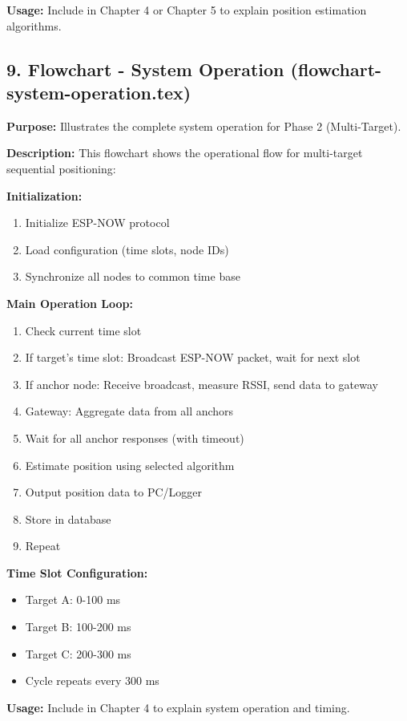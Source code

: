 \textbf{Usage:} Include in Chapter 4 or Chapter 5 to explain position estimation algorithms.

\subsection*{9. Flowchart - System Operation (flowchart-system-operation.tex)}
\textbf{Purpose:} Illustrates the complete system operation for Phase 2 (Multi-Target).

\textbf{Description:}
This flowchart shows the operational flow for multi-target sequential positioning:

\textbf{Initialization:}
\begin{enumerate}
    \item Initialize ESP-NOW protocol
    \item Load configuration (time slots, node IDs)
    \item Synchronize all nodes to common time base
\end{enumerate}

\textbf{Main Operation Loop:}
\begin{enumerate}
    \item Check current time slot
    \item If target's time slot: Broadcast ESP-NOW packet, wait for next slot
    \item If anchor node: Receive broadcast, measure RSSI, send data to gateway
    \item Gateway: Aggregate data from all anchors
    \item Wait for all anchor responses (with timeout)
    \item Estimate position using selected algorithm
    \item Output position data to PC/Logger
    \item Store in database
    \item Repeat
\end{enumerate}

\textbf{Time Slot Configuration:}
\begin{itemize}
    \item Target A: 0-100 ms
    \item Target B: 100-200 ms
    \item Target C: 200-300 ms
    \item Cycle repeats every 300 ms
\end{itemize}

\textbf{Usage:} Include in Chapter 4 to explain system operation and timing.

